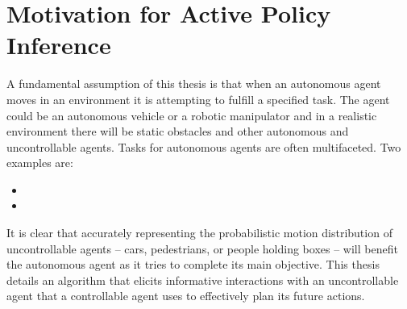 %
%
\chapter{Motivation for Active Policy Inference}\label{chapt:motivation}

%
%
%
%

    A fundamental assumption of this thesis is that when an autonomous agent moves in an environment it is attempting to
    fulfill a specified task. The agent could be an autonomous vehicle or a robotic manipulator and in a realistic
    environment there will be static obstacles and other autonomous and uncontrollable agents. Tasks for autonomous
    agents are often multifaceted. Two examples are:
    \begin{itemize}
        \item {}
        \item {}
   \end{itemize}

        It is clear that
    accurately representing the probabilistic motion distribution of uncontrollable agents -- cars, pedestrians, or
    people holding boxes -- will benefit the autonomous agent as it tries to complete its main objective. This thesis
    details an algorithm that elicits informative interactions with an uncontrollable agent that a controllable agent
    uses to effectively plan its future actions.


